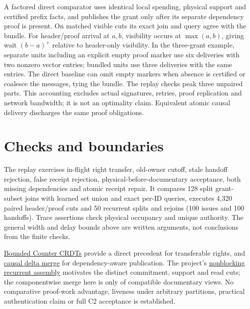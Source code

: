 \documentclass[11pt]{article}
\begin{document}
A factored direct comparator uses identical local spending, physical support and certified prefix facts, and publishes the grant only after its separate dependency proof is present. On matched visible cuts its exact join and query agree with the bundle. For header/proof arrival at $a,b$, visibility occurs at $\max(a,b)$, giving wait $(b-a)^+$ relative to header-only visibility. In the three-grant example, separate units including an explicit empty proof marker use six deliveries with two nonzero vector entries; bundled units use three deliveries with the same entries. The direct baseline can omit empty markers when absence is certified or coalesce the messages, tying the bundle. The replay checks peak three unpaired parts. This accounting excludes actual signatures, retries, proof replication and network bandwidth; it is not an optimality claim. Equivalent atomic causal delivery discharges the same proof obligations.

\section{Checks and boundaries}
The replay exercises in-flight right transfer, old-owner cutoff, stale handoff rejection, false receipt rejection, physical-before-documentary acceptance, both missing dependencies and atomic receipt repair. It compares 128 split grant-subset joins with learned set union and exact per-ID queries, executes 4,320 paired header/proof cuts and 50 recurrent splits and rejoins (100 issues and 100 handoffs). Trace assertions check physical occupancy and unique authority. The general width and delay bounds above are written arguments, not conclusions from the finite checks.

\href{https://arxiv.org/abs/1503.09052}{Bounded Counter CRDTs} provide a direct precedent for transferable rights, and \href{https://arxiv.org/abs/1603.01529}{causal delta merge} for dependency-aware publication. The project's \href{https://github.com/eternal-november/eos-research-programmes/blob/e1348964f73704212d2d8b48d5982a5ed600a2ff/projects/contextual-composition/foundations/native-whole-scope-feedback/Nonblocking_Recurrent_Assembly_Reading_Route.tex}{nonblocking recurrent assembly} motivates the distinct commitment, support and read cuts; the componentwise merge here is only of compatible documentary views. No comparative proof-work advantage, liveness under arbitrary partitions, practical authentication claim or full C2 acceptance is established.
\end{document}

